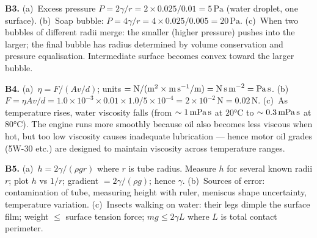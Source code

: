 \textbf{B3.}
(a)~Excess pressure $P=2\gamma/r
=2\times0.025/0.01=5\,\text{Pa}$ (water droplet, one
surface). \quad
(b)~Soap bubble: $P=4\gamma/r=4\times0.025/0.005
=20\,\text{Pa}$. \quad
(c)~When two bubbles of different radii merge: the
smaller (higher pressure) pushes into the larger;
the final bubble has radius determined by volume
conservation and pressure equalisation. Intermediate
surface becomes convex toward the larger bubble.

\textbf{B4.}
(a)~$\eta=F/(Av/d)$; units $=\text{N}/(\text{m}^2
\times\text{m\,s}^{-1}/\text{m})=\text{N\,s\,m}^{-2}
=\text{Pa\,s}$. \quad
(b)~$F=\eta A v/d=1.0\times10^{-3}\times0.01
\times1.0/5\times10^{-4}=2\times10^{-2}\,\text{N}
=0.02\,\text{N}$. \quad
(c)~As temperature rises, water viscosity falls
(from $\sim1\,\text{mPa\,s}$ at $20°\text{C}$ to
$\sim0.3\,\text{mPa\,s}$ at $80°\text{C}$).
The engine runs more smoothly because oil also becomes
less viscous when hot, but too low viscosity causes
inadequate lubrication --- hence motor oil grades
(5W-30 etc.) are designed to maintain viscosity across
temperature ranges.

\textbf{B5.}
(a)~$h=2\gamma/(\rho g r)$ where $r$ is tube radius.
Measure $h$ for several known radii $r$; plot $h$ vs
$1/r$; gradient $=2\gamma/(\rho g)$; hence $\gamma$. \quad
(b)~Sources of error: contamination of tube, measuring
height with ruler, meniscus shape uncertainty,
temperature variation. \quad
(c)~Insects walking on water: their legs dimple the
surface film; weight $\leq$ surface tension force;
$mg\leq2\gamma L$ where $L$ is total contact
perimeter.

\endgroup


